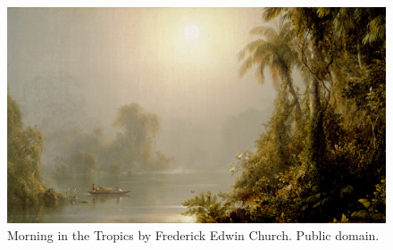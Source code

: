 \begin{figure}[ht]
        \includegraphics[width=\linewidth]{../../pictures/Frederick_Edwin_Church_-_Morning_in_the_Tropics_-_Walters_37147.jpg}
        \captionsetup{width=\linewidth}
        \caption{\footnotesize Morning in the Tropics by Frederick Edwin Church. Public domain.}
\end{figure}


